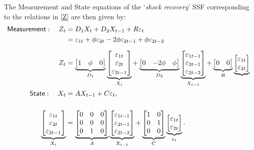 \documentclass[a4paper,12pt]{article}
\newcommand{\bsq}{\begin{subequations}}\newcommand{\esq}{\end{subequations}}
\begin{document}
The Measurement and State equations of the `\emph{shock recovery}' SSF
corresponding to the relations in \ref{Z} are then given by:\bsq\label{K0SSM}%
\begin{align}
\mathsf{Measurement}:\quad Z_{t}& =D_{1}X_{t}+D_{2}X_{t-1}+R\varepsilon _{t}
\notag \\
& =\varepsilon _{1t}+\phi \varepsilon _{2t}-2\phi \varepsilon _{2t-1}+\phi
\varepsilon _{2t-2} \\[2mm]
Z_{t}& =\underbrace{%
\begin{bmatrix}
1 & \phi  & 0%
\end{bmatrix}%
}_{D_{1}}\underbrace{%
\begin{bmatrix}
\varepsilon _{1t} \\ 
\varepsilon _{2t} \\ 
\varepsilon _{2t-1}%
\end{bmatrix}%
}_{X_{t}}+\underbrace{%
\begin{bmatrix}
0 & -2\phi  & \phi 
\end{bmatrix}%
}_{D_{2}}\underbrace{%
\begin{bmatrix}
\varepsilon _{1t-1} \\ 
\varepsilon _{2t-1} \\ 
\varepsilon _{2t-2}%
\end{bmatrix}%
}_{X_{t-1}}+\underbrace{%
\begin{bmatrix}
0 & 0%
\end{bmatrix}%
}_{R}\underbrace{%
\begin{bmatrix}
\varepsilon _{1t} \\ 
\varepsilon _{2t}%
\end{bmatrix}%
} \\
\mathsf{State}:\quad X_{t}& =AX_{t-1}+C\varepsilon _{t},  \notag \\[5mm]
\underbrace{%
\begin{bmatrix}
\varepsilon _{1t} \\ 
\varepsilon _{2t} \\ 
\varepsilon _{2t-1}%
\end{bmatrix}%
}_{X_{t}}& =\underbrace{%
\begin{bmatrix}
0 & 0 & 0 \\ 
0 & 0 & 0 \\ 
0 & 1 & 0%
\end{bmatrix}%
}_{A}\underbrace{%
\begin{bmatrix}
\varepsilon _{1t-1} \\ 
\varepsilon _{2t-1} \\ 
\varepsilon _{2t-2}%
\end{bmatrix}%
}_{X_{t-1}}+\underbrace{%
\begin{bmatrix}
1 & 0 \\ 
0 & 1 \\ 
0 & 0%
\end{bmatrix}%
}_{C}\underbrace{%
\begin{bmatrix}
\varepsilon _{1t} \\ 
\varepsilon _{2t}%
\end{bmatrix}%
}_{\varepsilon _{t}}.
\end{align}%
\esq
\end{document}
